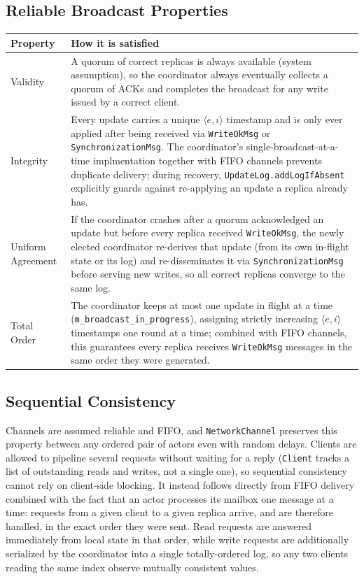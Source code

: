 \subsection{Reliable Broadcast Properties}

\begin{center}
\small
\begin{tabular}{|C{2.8cm}|C{13cm}|}
\hline
\textbf{Property} & \textbf{How it is satisfied} \\
\hline
Validity & A quorum of correct replicas is always available (system assumption), so the coordinator always eventually collects a quorum of ACKs and completes the
broadcast for any write issued by a correct client. \\
\hline
Integrity & Every update carries a unique $\langle e,i\rangle$ timestamp and is only ever applied
after being received via \texttt{WriteOkMsg} or \texttt{SynchronizationMsg}. The coordinator's single-broadcast-at-a-time implmentation together
with FIFO channels prevents duplicate delivery; during recovery, \texttt{UpdateLog.addLogIfAbsent}
explicitly guards against re-applying an update a replica already has. \\
\hline
Uniform Agreement & If the coordinator crashes after a quorum acknowledged an update but before every
replica received \texttt{WriteOkMsg}, the newly elected coordinator re-derives that update (from its
own in-flight state or its log) and re-disseminates it via \texttt{SynchronizationMsg} before serving
new writes, so all correct replicas converge to the same log. \\
\hline
Total Order & The coordinator keeps at most one update in flight at a time
(\texttt{m\_broadcast\_in\_progress}), assigning strictly increasing $\langle e,i\rangle$ timestamps
one round at a time; combined with FIFO channels, this guarantees every replica receives
\texttt{WriteOkMsg} messages in the same order they were generated. \\
\hline
\end{tabular}
\end{center}

\subsection{Sequential Consistency}

Channels are assumed reliable and FIFO, and \texttt{NetworkChannel} preserves this property between
any ordered pair of actors even with random delays. Clients are allowed to pipeline several requests
without waiting for a reply (\texttt{Client} tracks a list of outstanding reads and writes, not a
single one), so sequential consistency cannot rely on client-side blocking. It instead follows
directly from FIFO delivery combined with the fact that an actor processes its mailbox one message at
a time: requests from a given client to a given replica arrive, and are therefore handled, in the
exact order they were sent. Read requests are answered immediately from local state in that order,
while write requests are additionally serialized by the coordinator into a single totally-ordered
log, so any two clients reading the same index observe mutually consistent values.

